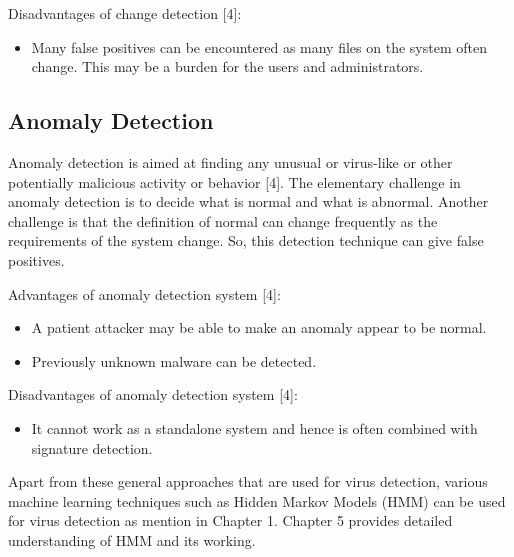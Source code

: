 Disadvantages of change detection [4]:
\begin{itemize}
\item Many false positives can be encountered as many files on the system often change. This may be a burden for the users and administrators.
\end{itemize}

\subsection{Anomaly Detection}
Anomaly detection is aimed at finding any unusual or virus-like or other potentially malicious activity or behavior [4]. The elementary challenge in anomaly detection is to decide what is normal and what is abnormal. Another challenge is that the definition of normal can change frequently as the requirements of the system change. So, this detection technique can give false positives. 

Advantages of anomaly detection system [4]:
\begin{itemize}
\item A patient attacker may be able to make an anomaly appear to be normal.
\item Previously unknown malware can be detected.
\end{itemize}

Disadvantages of anomaly detection system [4]:
\begin{itemize}
\item It cannot work as a standalone system and hence is often combined with signature detection. 
\end{itemize}

Apart from these general approaches that are used for virus detection, various machine learning techniques such as Hidden Markov Models (HMM) can be used for virus detection as mention in Chapter 1. Chapter 5 provides detailed understanding of HMM and its working. 
